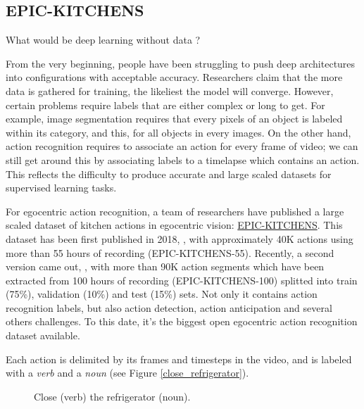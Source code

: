 \documentclass[12pt, a4paper]{report}
\begin{document}
			\subsection{EPIC-KITCHENS}
				What would be deep learning without data ?
				\par
				From the very beginning, people have been struggling to push deep architectures into configurations with acceptable accuracy.
				Researchers claim that the more data is gathered for training, the likeliest the model will converge.
				However, certain problems require labels that are either complex or long to get.
				For example, image segmentation requires that every pixels of an object is labeled within its category, and this, for all objects in every images.
				On the other hand, action recognition requires to associate an action for every frame of video; we can still get around this by associating labels to a timelapse which contains an action.
				This reflects the difficulty to produce accurate and large scaled datasets for supervised learning tasks.
				\par
				For egocentric action recognition, a team of researchers have published a large scaled dataset of kitchen actions in egocentric vision: \href{https://epic-kitchens.github.io/2021}{EPIC-KITCHENS}.
				This dataset has been first published in 2018, \cite{damen2018scaling}, with approximately 40K actions using more than 55 hours of recording (EPIC-KITCHENS-55).
				Recently, a second version came out, \cite{damen2020rescaling}, with more than 90K action segments which have been extracted from 100 hours of recording (EPIC-KITCHENS-100) splitted into train (75\%), validation (10\%) and test (15\%) sets.
				Not only it contains action recognition labels, but also action detection, action anticipation and several others challenges.
				To this date, it's the biggest open egocentric action recognition dataset available.
				\par
				Each action is delimited by its frames and timesteps in the video, and is labeled with a {\itshape verb} and a {\itshape noun} (see Figure \ref{close_refrigerator}).
				\begin{figure}[h!]
					\centering
					\caption{Close ({\small verb}) the refrigerator ({\small noun}).}
				\end{figure}
\end{document}
